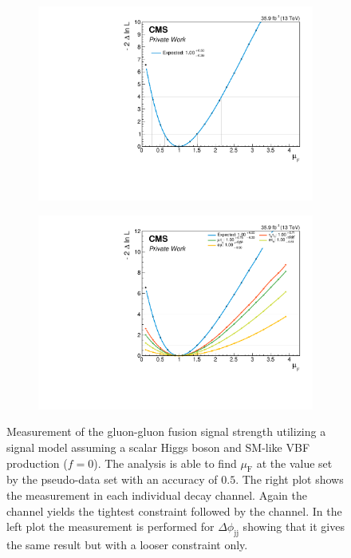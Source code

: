 \begin{figure}[h!]
    \centering
    \begin{subfigure}{.49\textwidth}
        \centering
        \includegraphics[width=\textwidth]{Figures/statana/Scan_JEC_mela3D/muF.pdf}
    \end{subfigure}
    \begin{subfigure}{.49\textwidth}
        \centering
        \includegraphics[width=\textwidth]{Figures/statana/Scan_JEC_mela3D/muF_channel.pdf}
    \end{subfigure}
    \caption[Measurement of the signal strength modifier $\mu_\text{F}$ with the MELA approach.]{Measurement of the gluon-gluon fusion signal strength utilizing a signal model assuming a scalar Higgs boson and SM-like VBF production ($f=\text{0}$). The analysis is able to find $\mu_\text{F}$ at the value set by the pseudo-data set with an accuracy of $0.5$.
    The right plot shows the measurement in each individual decay channel. Again the \tautau{} channel yields the tightest constraint followed by the 
    \mutau{} channel. In the left plot the measurement is performed for $\Delta\phi_\text{jj}$ showing that it gives the same result but with a looser constraint only.}\label{statana:scan_muF_f0}
\end{figure}

